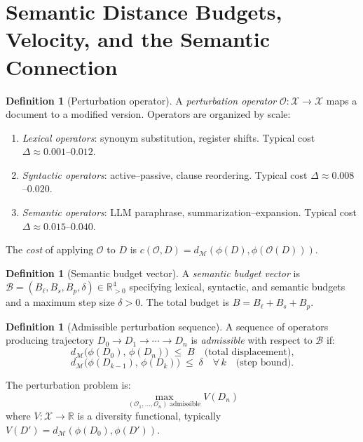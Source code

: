 \documentclass[12pt, a4paper]{article}
\theoremstyle{plain}
\theoremstyle{definition}
\newtheorem{definition}[theorem]{Definition}
\theoremstyle{remark}
\newcommand{\calX}{\mathcal{X}}
\newcommand{\calM}{\mathcal{M}}
\newcommand{\calO}{\mathcal{O}}
\newcommand{\bR}{\mathbb{R}}
\newcommand{\dM}{d_{\calM}}
\begin{document}
\section{Semantic Distance Budgets, Velocity, and the Semantic Connection}
\label{sec:budget}

\begin{definition}[Perturbation operator]
\label{def:operator}
A \emph{perturbation operator} $\calO : \calX \to \calX$ maps a document to a
modified version.  Operators are organized by scale:
\begin{enumerate}[label=(\roman*)]
  \item \emph{Lexical operators}: synonym substitution, register shifts.
        Typical cost $\Delta \approx 0.001$--$0.012$.
  \item \emph{Syntactic operators}: active--passive, clause reordering.
        Typical cost $\Delta \approx 0.008$--$0.020$.
  \item \emph{Semantic operators}: LLM paraphrase, summarization--expansion.
        Typical cost $\Delta \approx 0.015$--$0.040$.
\end{enumerate}
The \emph{cost} of applying $\calO$ to $D$ is
$c(\calO, D) = \dM(\phi(D), \phi(\calO(D)))$.
\end{definition}

\begin{definition}[Semantic budget vector]
\label{def:budget}
A \emph{semantic budget vector} is
$\mathcal{B} = (B_\ell, B_s, B_p, \delta) \in \bR_{>0}^4$
specifying lexical, syntactic, and semantic budgets and a maximum step size
$\delta > 0$.  The total budget is $B = B_\ell + B_s + B_p$.
\end{definition}

\begin{definition}[Admissible perturbation sequence]
\label{def:admissible}
A sequence of operators producing trajectory $D_0 \to D_1 \to \cdots \to D_n$
is \emph{admissible} with respect to $\mathcal{B}$ if:
\[
   \dM\bigl(\phi(D_0),\, \phi(D_n)\bigr) \;\le\; B
   \quad\text{(total displacement),}
\]
\[
   \dM\bigl(\phi(D_{k-1}),\, \phi(D_k)\bigr) \;\le\; \delta
   \quad\forall\, k\quad\text{(step bound).}
\]
\end{definition}

The perturbation problem is:
\begin{equation}
\label{eq:opt}
   \max_{(\calO_1,\ldots,\calO_n)\;\text{admissible}} V(D_n)
\end{equation}
where $V : \calX \to \bR$ is a diversity functional, typically
$V(D') = \dM(\phi(D_0), \phi(D'))$.
\end{document}
